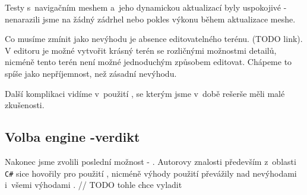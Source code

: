 Testy s~navigačním meshem a~jeho dynamickou aktualizací byly uspokojivé - nenarazili jsme na žádný zádrhel nebo pokles výkonu během aktualizace meshe. 

Co musíme zmínit jako nevýhodu je absence editovatelného terénu. (TODO link). V editoru je možné vytvořit krásný terén se rozličnými možnostmi detailů, nicméně tento terén není možné jednoduchým způsobem editovat. Chápeme to spíše jako nepříjemnost, než zásadní nevýhodu. 

Další komplikaci vidíme v~použití \CPP{}, se kterým jsme v~době rešerše měli malé zkušenosti.




\subsection{Volba engine -verdikt}


Nakonec jsme zvolili poslední možnost - \UE{}. Autorovy znalosti především z~oblasti \texttt{C\#} sice hovořily pro použití \UN{}, nicméně výhody použití \UE{} převážily nad nevýhodami i~všemi výhodami \UN{}.	// TODO tohle chce vyladit
